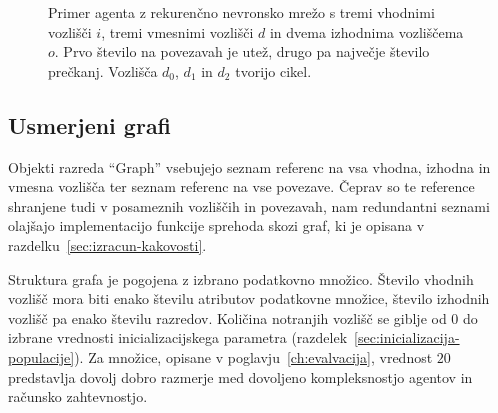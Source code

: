 \documentclass[a4paper,12pt,openright]{book}
\begin{document}
    \begin{figure}[H]
        \centering
        \caption{Primer agenta z rekurenčno nevronsko mrežo s tremi vhodnimi vozlišči $i$, tremi vmesnimi vozlišči $d$ in
        dvema izhodnima vozliščema $o$. Prvo število na povezavah je utež, drugo pa največje število prečkanj. Vozlišča
            $d_0$, $d_1$ in $d_2$ tvorijo cikel.}
        \label{fig:skica_agenta}
    \end{figure}

    \subsection{Usmerjeni grafi}\label{subsec:usmerjeni-grafi}
    Objekti razreda \enquote{Graph} vsebujejo seznam referenc na vsa vhodna, izhodna in vmesna vozlišča ter seznam referenc
    na vse povezave.
    Čeprav so te reference shranjene tudi v posameznih vozliščih in povezavah, nam redundantni seznami olajšajo
    implementacijo funkcije sprehoda skozi graf, ki je opisana v razdelku~\ref{sec:izracun-kakovosti}.

    Struktura grafa je pogojena z izbrano podatkovno množico.
    Število vhodnih vozlišč mora biti enako številu atributov podatkovne mno\-ži\-ce, šte\-vi\-lo izhodnih vozlišč pa enako številu razredov.
    Količina notranjih vozlišč se giblje od 0 do izbrane vrednosti inicializacijskega parametra (razdelek~\ref{sec:inicializacija-populacije}).
    Za množice, opisane v poglavju~\ref{ch:evalvacija}, vrednost $20$ predstavlja dovolj dobro razmerje med dovoljeno kompleksnostjo agentov in
    računsko zahtevnostjo.
\end{document}

